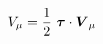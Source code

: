 \begin{equation}
V_\mu= \frac{1}{2} ~\mbox{\boldmath$\tau$} \cdot \mbox{\boldmath$V$}_\mu
\end{equation}

